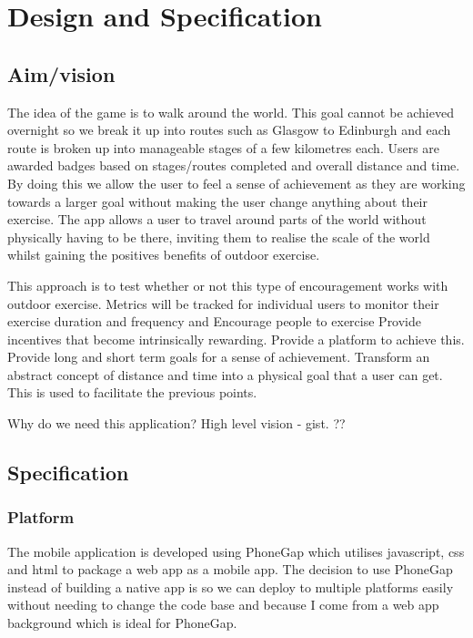 \chapter{Design and Specification}\label{ch_method}

\section{Aim/vision}

The idea of the game is to walk around the world. This goal cannot be achieved overnight so we break it up into routes such as Glasgow to Edinburgh and each route is broken up into manageable stages of a few kilometres each. Users are awarded badges based on stages/routes completed and overall distance and time. By doing this we allow the user to feel a sense of achievement as they are working towards a larger goal without making the user change anything about their exercise. The app allows a user to travel around parts of the world without physically having to be there, inviting them to realise the scale of the world whilst gaining the positives benefits of outdoor exercise. 

This approach is to test whether or not this type of encouragement works with outdoor exercise. Metrics will be tracked for individual users to monitor their exercise duration and frequency and 
Encourage people to exercise
Provide incentives that become intrinsically rewarding.  
Provide a platform to achieve this.
Provide long and short term goals for a sense of achievement. 
Transform an abstract concept of distance and time into a physical goal that a user can get. This is used to facilitate the previous points.

Why do we need this application? High level vision - gist.
??



\section{Specification}
\subsection{Platform}
The mobile application is developed using PhoneGap which utilises
javascript, css and html to package a web app as a mobile app. The
decision to use PhoneGap instead of building a native app is so we can
deploy to multiple platforms easily without needing to change the code
base and because I come from a web app background which is ideal for
PhoneGap.

